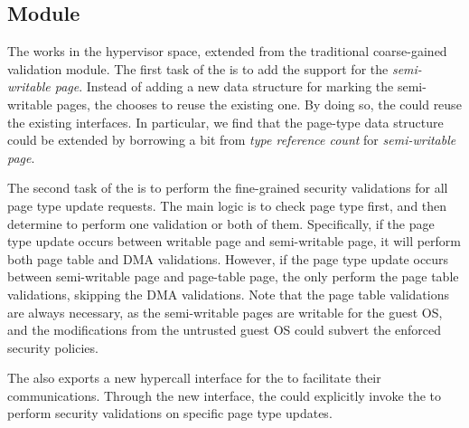 \subsection{\name Module}\label{sec:module}
The \module works in the hypervisor space, extended from the traditional coarse-gained validation module.
The first task of the \module is to add the support for the \emph{semi-writable page}.
Instead of adding a new data structure for marking the semi-writable pages, the \module chooses to reuse the existing one.
By doing so, the \module could reuse the existing interfaces.
In particular, we find that the page-type data structure could be extended by borrowing a bit from \emph{type reference count} for \emph{semi-writable page}.

The second task of the \module is to perform the fine-grained security validations for all page type update requests.
The main logic is to check page type first, and then determine to perform one validation or both of them.
Specifically, if the page type update occurs between writable page and semi-writable page, it will perform both page table and DMA validations.
However, if the page type update occurs between semi-writable page and page-table page, the \module only perform the page table validations, skipping the DMA validations.
Note that the page table validations are always necessary, as the semi-writable pages are writable for the guest OS, and the modifications from the untrusted guest OS could subvert the enforced security policies.


The \module also exports a new hypercall interface for the \cache to facilitate their communications.
Through the new interface, the \cache could explicitly invoke the \module to perform security validations on specific page type updates.

